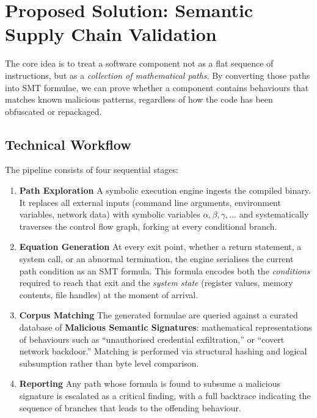  
\section{Proposed Solution: Semantic Supply Chain Validation}
 
The core idea is to treat a software component not as a flat sequence of instructions, but as a \textit{collection of mathematical paths}. By converting those paths into SMT formulae, we can prove whether a component contains behaviours that matches known malicious patterns, regardless of how the code has been obfuscated or repackaged.
 
\subsection{Technical Workflow}
 
The pipeline consists of four sequential stages:
 
\begin{enumerate}
 
    \item \textbf{Path Exploration} A symbolic execution engine ingests the compiled binary. It replaces all external inputs (command line arguments, environment variables, network data) with symbolic variables $\alpha, \beta, \gamma, \ldots$ and systematically traverses the control flow graph, forking at every conditional branch.
 
    \item \textbf{Equation Generation} At every exit point, whether a return statement, a system call, or an abnormal termination, the engine serialises the current path condition as an SMT formula. This formula encodes both the \textit{conditions} required to reach that exit and the \textit{system state} (register values, memory contents, file handles) at the moment of arrival.
 
    \item \textbf{Corpus Matching} The generated formulae are queried against a curated database of \textbf{Malicious Semantic Signatures}: mathematical representations of behaviours such as ``unauthorised credential exfiltration,'' or ``covert network backdoor.'' Matching is performed via structural hashing and logical subsumption rather than byte level comparison.
 
    \item \textbf{Reporting} Any path whose formula is found to subsume a malicious signature is escalated as a critical finding, with a full backtrace indicating the sequence of branches that leads to the offending behaviour.
 
\end{enumerate}
 
